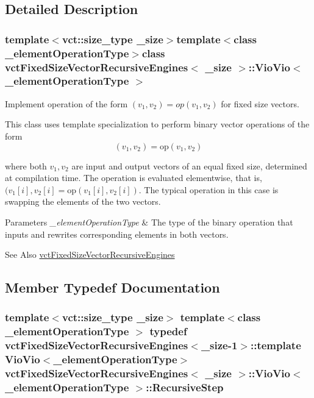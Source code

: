 \subsection{Detailed Description}
\subsubsection*{template$<$vct\-::size\-\_\-type \-\_\-size$>$template$<$class \-\_\-element\-Operation\-Type$>$class vct\-Fixed\-Size\-Vector\-Recursive\-Engines$<$ \-\_\-size $>$\-::\-Vio\-Vio$<$ \-\_\-element\-Operation\-Type $>$}

Implement operation of the form $(v_{1}, v_{2}) = op(v_{1}, v_{2})$ for fixed size vectors. 

This class uses template specialization to perform binary vector operations of the form \[ (v_{1}, v_{2}) = \mathrm{op}(v_{1}, v_{2}) \]

where both $v_{1}, v_{2}$ are input and output vectors of an equal fixed size, determined at compilation time. The operation is evaluated elementwise, that is, $(v_{1}[i], v_{2}[i] = \mathrm{op}(v_{1}[i], v_{2}[i])$. The typical operation in this case is swapping the elements of the two vectors.


\begin{DoxyParams}{Parameters}
{\em \-\_\-element\-Operation\-Type} & The type of the binary operation that inputs and rewrites corresponding elements in both vectors.\\
\hline
\end{DoxyParams}
\begin{DoxySeeAlso}{See Also}
\hyperlink{classvct_fixed_size_vector_recursive_engines}{vct\-Fixed\-Size\-Vector\-Recursive\-Engines} 
\end{DoxySeeAlso}


\subsection{Member Typedef Documentation}
\hypertarget{classvct_fixed_size_vector_recursive_engines_1_1_vio_vio_a90191766e286b1e089653e847b102a73}{
\subsubsection[{Recursive\-Step}]{\setlength{\rightskip}{0pt plus 5cm}template$<$vct\-::size\-\_\-type \-\_\-size$>$ template$<$class \-\_\-element\-Operation\-Type $>$ typedef {\bf vct\-Fixed\-Size\-Vector\-Recursive\-Engines}$<$\-\_\-size-\/1$>$\-::template {\bf Vio\-Vio}$<$\-\_\-element\-Operation\-Type$>$ {\bf vct\-Fixed\-Size\-Vector\-Recursive\-Engines}$<$ \-\_\-size $>$\-::{\bf Vio\-Vio}$<$ \-\_\-element\-Operation\-Type $>$\-::{\bf Recursive\-Step}}}\label{classvct_fixed_size_vector_recursive_engines_1_1_vio_vio_a90191766e286b1e089653e847b102a73}


